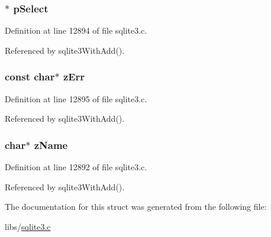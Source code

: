 \hypertarget{struct_with_1_1_cte_ab0e0ccc47de126415a7ad889ff1d228a}{}
\subsubsection[{p\+Select}]{$\ast$ p\+Select}\label{struct_with_1_1_cte_ab0e0ccc47de126415a7ad889ff1d228a}


Definition at line 12894 of file sqlite3.\+c.



Referenced by sqlite3\+With\+Add().

\hypertarget{struct_with_1_1_cte_af0fff85d0bf7908faa6384390c7b2daa}{}
\subsubsection[{z\+Err}]{\setlength{\rightskip}{0pt plus 5cm}const char$\ast$ z\+Err}\label{struct_with_1_1_cte_af0fff85d0bf7908faa6384390c7b2daa}


Definition at line 12895 of file sqlite3.\+c.



Referenced by sqlite3\+With\+Add().

\hypertarget{struct_with_1_1_cte_a661118d86ac4127d40bf3be78d92117d}{}
\subsubsection[{z\+Name}]{\setlength{\rightskip}{0pt plus 5cm}char$\ast$ z\+Name}\label{struct_with_1_1_cte_a661118d86ac4127d40bf3be78d92117d}


Definition at line 12892 of file sqlite3.\+c.



Referenced by sqlite3\+With\+Add().



The documentation for this struct was generated from the following file\+:\begin{DoxyCompactItemize}
\item 
libs/\hyperlink{sqlite3_8c}{sqlite3.\+c}\end{DoxyCompactItemize}
